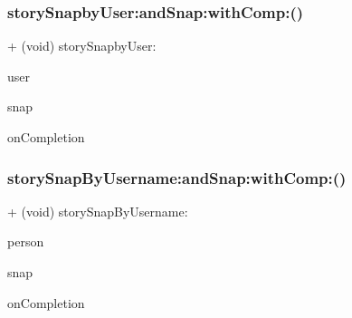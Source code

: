 \subsubsection{\texorpdfstring{story\+Snapby\+User\+:and\+Snap\+:with\+Comp\+:()}{storySnapbyUser:andSnap:withComp:()}}
{\footnotesize\ttfamily + (void) story\+Snapby\+User\+: \begin{DoxyParamCaption}\item[{(\hyperlink{interface_user_info}{User\+Info} $\ast$)}]{user }\item[{andSnap:(\hyperlink{interface_snap}{Snap} $\ast$)}]{snap }\item[{withComp:(void($^\wedge$)(B\+O\+OL, id))}]{on\+Completion }\end{DoxyParamCaption}}

\hypertarget{interface_post_afc7290f582fbcd44144662be256b8dc7}{}\label{interface_post_afc7290f582fbcd44144662be256b8dc7} 
\subsubsection{\texorpdfstring{story\+Snap\+By\+Username\+:and\+Snap\+:with\+Comp\+:()}{storySnapByUsername:andSnap:withComp:()}}
{\footnotesize\ttfamily + (void) story\+Snap\+By\+Username\+: \begin{DoxyParamCaption}\item[{(N\+S\+String $\ast$)}]{person }\item[{andSnap:(\hyperlink{interface_snap}{Snap} $\ast$)}]{snap }\item[{withComp:(void($^\wedge$)(B\+O\+OL, id))}]{on\+Completion }\end{DoxyParamCaption}}

\hypertarget{interface_post_a1c6363f5ccef293edf135ca5d2a8af14}{}\label{interface_post_a1c6363f5ccef293edf135ca5d2a8af14} 
